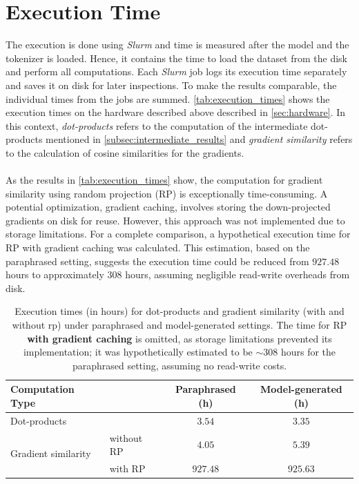 \section{Execution Time}\label{sec:exec_time}
The execution is done using \textit{Slurm} and time is measured after the model and the tokenizer is loaded. Hence, it contains the time to load the dataset from the disk and perform all computations. Each \emph{Slurm} job logs its execution time separately and saves it on disk for later inspections. To make the results comparable, the individual times from the jobs are summed. \autoref{tab:execution_times} shows the execution times on the hardware described above described in \autoref{sec:hardware}. In this context, \emph{dot-products} refers to the computation of the intermediate dot-products mentioned in \autoref{subsec:intermediate_results} and \emph{gradient similarity} refers to the calculation of cosine similarities for the gradients.
\\\\
As the results in \autoref{tab:execution_times} show, the computation for gradient similarity using random projection (RP) is exceptionally time-consuming. A potential optimization, gradient caching, involves storing the down-projected gradients on disk for reuse. However, this approach was not implemented due to storage limitations. For a complete comparison, a hypothetical execution time for RP with gradient caching was calculated. This estimation, based on the paraphrased setting, suggests the execution time could be reduced from $927.48$ hours to approximately 308 hours, assuming negligible read-write overheads from disk.

\begin{table}[htb!]
    \centering
    \begin{tabular}{|l l|c|c|}
        \hline
        \textbf{Computation Type} & & \textbf{Paraphrased (h)} & \textbf{Model-generated (h)} \\
        \hline
        Dot-products & & $3.54$ & $3.35$ \\
        \hline
        \multirow{2}{*}{Gradient similarity} 
            & without RP & $4.05$ & $5.39$ \\
            & with RP & $927.48$ & $925.63$ \\
        \hline
    \end{tabular}
    \caption{Execution times (in hours) for dot-products and gradient similarity (with and without \acrfull{rp}) under paraphrased and model-generated settings. The time for RP \textbf{with gradient caching} is omitted, as storage limitations prevented its implementation; it was hypothetically estimated to be $\sim$308 hours for the paraphrased setting, assuming no read-write costs.}
    \label{tab:execution_times}
\end{table}
